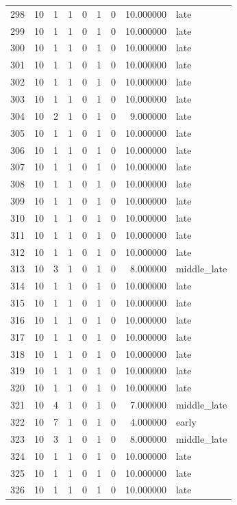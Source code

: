 \begin{longtable}{rrrrrrrrl}
298 & 10 & 1 & 1 & 0 & 1 & 0 & 10.000000 & late \\
299 & 10 & 1 & 1 & 0 & 1 & 0 & 10.000000 & late \\
300 & 10 & 1 & 1 & 0 & 1 & 0 & 10.000000 & late \\
301 & 10 & 1 & 1 & 0 & 1 & 0 & 10.000000 & late \\
302 & 10 & 1 & 1 & 0 & 1 & 0 & 10.000000 & late \\
303 & 10 & 1 & 1 & 0 & 1 & 0 & 10.000000 & late \\
304 & 10 & 2 & 1 & 0 & 1 & 0 & 9.000000 & late \\
305 & 10 & 1 & 1 & 0 & 1 & 0 & 10.000000 & late \\
306 & 10 & 1 & 1 & 0 & 1 & 0 & 10.000000 & late \\
307 & 10 & 1 & 1 & 0 & 1 & 0 & 10.000000 & late \\
308 & 10 & 1 & 1 & 0 & 1 & 0 & 10.000000 & late \\
309 & 10 & 1 & 1 & 0 & 1 & 0 & 10.000000 & late \\
310 & 10 & 1 & 1 & 0 & 1 & 0 & 10.000000 & late \\
311 & 10 & 1 & 1 & 0 & 1 & 0 & 10.000000 & late \\
312 & 10 & 1 & 1 & 0 & 1 & 0 & 10.000000 & late \\
313 & 10 & 3 & 1 & 0 & 1 & 0 & 8.000000 & middle\_late \\
314 & 10 & 1 & 1 & 0 & 1 & 0 & 10.000000 & late \\
315 & 10 & 1 & 1 & 0 & 1 & 0 & 10.000000 & late \\
316 & 10 & 1 & 1 & 0 & 1 & 0 & 10.000000 & late \\
317 & 10 & 1 & 1 & 0 & 1 & 0 & 10.000000 & late \\
318 & 10 & 1 & 1 & 0 & 1 & 0 & 10.000000 & late \\
319 & 10 & 1 & 1 & 0 & 1 & 0 & 10.000000 & late \\
320 & 10 & 1 & 1 & 0 & 1 & 0 & 10.000000 & late \\
321 & 10 & 4 & 1 & 0 & 1 & 0 & 7.000000 & middle\_late \\
322 & 10 & 7 & 1 & 0 & 1 & 0 & 4.000000 & early \\
323 & 10 & 3 & 1 & 0 & 1 & 0 & 8.000000 & middle\_late \\
324 & 10 & 1 & 1 & 0 & 1 & 0 & 10.000000 & late \\
325 & 10 & 1 & 1 & 0 & 1 & 0 & 10.000000 & late \\
326 & 10 & 1 & 1 & 0 & 1 & 0 & 10.000000 & late \\

\end{longtable}
